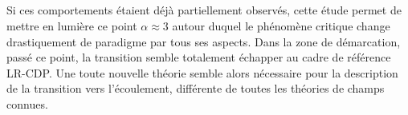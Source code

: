 \subparagraph{}Si ces comportements étaient déjà partiellement observés, cette étude permet de mettre en lumière ce point $\alpha \approx 3$ autour duquel le phénomène critique change drastiquement de paradigme par tous ses aspects. Dans la zone de démarcation, passé ce point, la transition semble totalement échapper au cadre de référence LR-CDP. Une toute nouvelle théorie semble alors nécessaire pour la description de la transition vers l'écoulement, différente de toutes les théories de champs connues.

